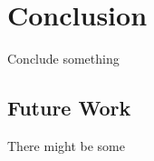 \chapter{Conclusion}\label{ch:conclusion}

Conclude something

\section{Future Work}

There might be some